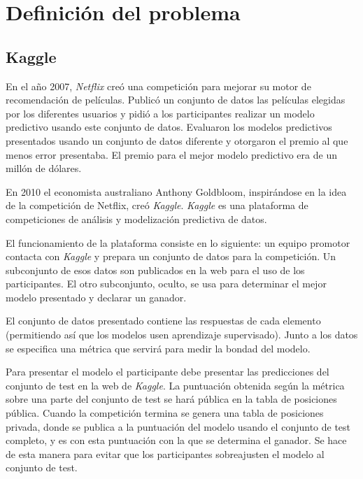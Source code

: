 
\chapter{Definición del problema}

\label{Chapter5} %

\section{Kaggle}

En el año 2007, \textit{Netflix} creó una competición para mejorar su motor de
recomendación de películas. Publicó un conjunto de datos las películas elegidas
por los diferentes usuarios y pidió a los participantes realizar un modelo
predictivo usando este conjunto de datos. Evaluaron los modelos predictivos
presentados usando un conjunto de datos diferente y otorgaron el premio al que
menos error presentaba. El premio para el mejor modelo predictivo era de un
millón de dólares.

En 2010 el economista australiano Anthony Goldbloom, inspirándose en la idea de
la competición de Netflix, creó \textit{Kaggle}. \textit{Kaggle} es una
plataforma de competiciones de análisis y modelización predictiva de datos.

El funcionamiento de la plataforma consiste en lo siguiente: un equipo promotor
contacta con \textit{Kaggle} y prepara un conjunto de datos para la competición.
Un subconjunto de esos datos son publicados en la web para el uso de los
participantes. El otro subconjunto, oculto, se usa para determinar el mejor
modelo presentado y declarar un ganador.

El conjunto de datos presentado contiene las respuestas de cada elemento
(permitiendo así que los modelos usen aprendizaje supervisado). Junto a los
datos se especifica una métrica que servirá para medir la bondad del modelo.

Para presentar el modelo el participante debe presentar las predicciones del
conjunto de test en la web de \textit{Kaggle}. La puntuación obtenida según la
métrica sobre una parte del conjunto de test se hará pública en la tabla de
posiciones pública. Cuando la competición termina se genera una tabla de
posiciones privada, donde se publica a la puntuación del modelo usando el
conjunto de test completo, y es con esta puntuación con la que se determina el
ganador. Se hace de esta manera para evitar que los participantes sobreajusten
el modelo al conjunto de test.

